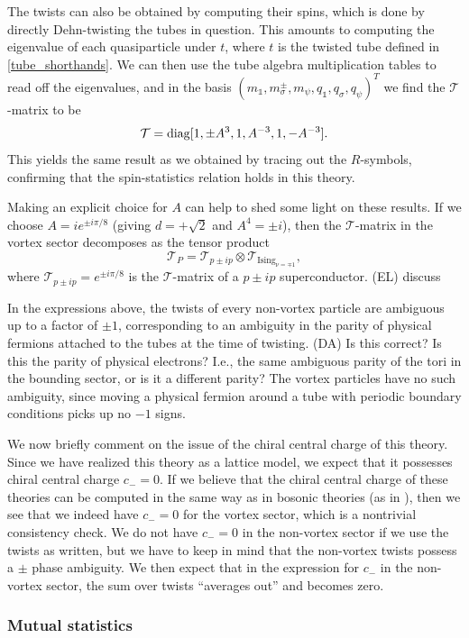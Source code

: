\documentclass[12pt,a4paper]{article}
\newcommand{\tp}{\otimes}
\newcommand{\unit}{\mathds{1}}
\newcommand{\mct}{\mathcal{T}}
\newcommand\be            {\begin{equation}}
\newcommand\ee            {\end{equation}}
\newcommand{\dave}[1]{{\color{ao(english)}\footnotesize{(DA) #1}}}
\newcommand{\ethan}[1]{{\color{amethyst}\footnotesize{(EL) #1}}}
\begin{document}
The twists can also be obtained by computing their spins, which is done by directly Dehn-twisting the tubes in question. 
This amounts to computing the eigenvalue of each quasiparticle under $t$, where $t$ is the twisted tube defined in \eqref{tube_shorthands}.
We can then use the tube algebra multiplication tables to read off the eigenvalues, and in the basis $(m_\unit,m^\pm_\sigma,m_\psi,q_\unit,q_\sigma,q_\psi)^T$ we find the $\mct$-matrix to be
\be \mct = {\rm diag}[1,\pm A^3,1,A^{-3},1,-A^{-3}].\ee
This yields the same result as we obtained by tracing out the $R$-symbols, confirming that the spin-statistics relation holds in this theory.

Making an explicit choice for $A$ can help to shed some light on these results. If we choose $A = ie^{\pm i \pi/8}$ (giving $d=+\sqrt{2}$ and $A^4 = \pm i$), then the $\mct$-matrix in the vortex sector decomposes as the tensor product
\be \mct_P = \mct_{p\pm ip} \tp \mct_{\text{Ising}_{\nu =\mp1}},\ee
where $\mct_{p\pm ip} = e^{\pm i\pi/8}$ is the $\mct$-matrix of a $p\pm ip$ superconductor. %
\ethan{discuss}

In the expressions above, the twists of every non-vortex particle are ambiguous up to a factor of $\pm1$, corresponding to an ambiguity in the parity of physical fermions attached to the tubes at the time of twisting.
\dave{Is this correct?
Is this the parity of physical electrons? 
I.e., the same ambiguous parity of the tori in the bounding sector, or is it a different parity?}
The vortex particles have no such ambiguity, since moving a physical fermion around a tube with periodic boundary conditions picks up no $-1$ signs.   

We now briefly comment on the issue of the chiral central charge of this theory. Since we have realized this theory as a lattice model, we expect that it possesses chiral central charge $c_- = 0$. 
If we believe that the chiral central charge of these theories can be computed in the same 
way as in bosonic theories (as in \cite{cano2014}), then we see that we indeed have $c_- =0$ for 
the vortex sector, which is a nontrivial consistency check. We do not have $c_-=0$ in the 
non-vortex sector if we use the twists as written, but we have to keep in mind that the 
non-vortex twists possess a $\pm$ phase ambiguity. We then expect that in the 
expression for $c_-$ in the non-vortex sector, the sum over twists ``averages out'' and becomes zero. 

\subsubsection{Mutual statistics}
\end{document}

